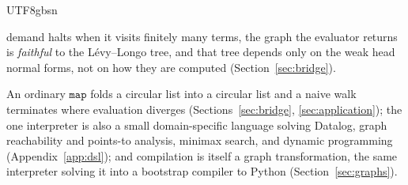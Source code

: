 \begin{CJK*}{UTF8}{gbsn}
\begin{description}
      demand halts when it visits finitely many terms, the graph the evaluator returns is
      \emph{faithful} to the L\'evy--Longo tree, and that tree depends only on the weak head normal forms, not on how they are computed
      (Section~\ref{sec:bridge}).
    \item[Applications] An ordinary
      $\mathtt{map}$ folds a circular list into a circular list and a naive walk terminates where
      evaluation diverges (Sections~\ref{sec:bridge}, \ref{sec:application}); the one interpreter is also a small
      domain-specific language solving Datalog, graph reachability and points-to analysis, minimax
      search, and dynamic programming (Appendix~\ref{app:dsl}); and compilation is itself a graph
      transformation, the same interpreter solving it into a bootstrap compiler to Python
      (Section~\ref{sec:graphs}).
  \end{description}
  \fi


\end{CJK*}
